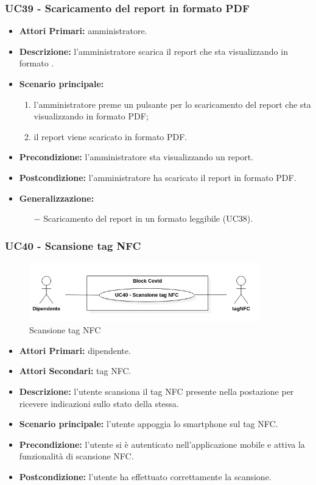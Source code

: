 \subsubsection{ UC39 - Scaricamento del report in formato PDF}
\begin{itemize}
	\item\textbf{Attori Primari:} 
	amministratore.
	\item\textbf{Descrizione:} 
	l'amministratore scarica il report che sta visualizzando in formato .
	\item\textbf{Scenario principale:} 
	\begin{enumerate}
		\item l'amministratore preme un pulsante per lo scaricamento del report che sta visualizzando in formato PDF;
		\item il report viene scaricato in formato PDF.
	\end{enumerate}
	\item\textbf{Precondizione:} 
	l'amministratore sta visualizzando un report.
	\item\textbf{Postcondizione:}
	l'amministratore ha scaricato il report in formato PDF.
	\item\textbf{Generalizzazione:}
	\begin{itemize}
		\item[$-$] Scaricamento del report in un formato leggibile (UC38).
	\end{itemize}
\end{itemize}

\subsubsection{ UC40 - Scansione tag NFC}
\begin{figure}[H]
	\centering
	\includegraphics[width=10cm]{res/images/UC40.png}
	\caption{Scansione tag NFC}
	\label{fig:Scansione tag NFC}
\end{figure}
\begin{itemize}
	\item\textbf{Attori Primari:} dipendente.
	\item\textbf{Attori Secondari:} tag NFC.
	\item\textbf{Descrizione:} l’utente scansiona il tag NFC presente nella postazione per ricevere indicazioni sullo stato della stessa.
	\item\textbf{Scenario principale:} l’utente appoggia lo smartphone sul tag NFC.
	\item\textbf{Precondizione:} l’utente si è autenticato nell'applicazione mobile e attiva la funzionalità di scansione NFC.
	\item\textbf{Postcondizione:} l’utente ha effettuato correttamente la scansione.
\end{itemize}

